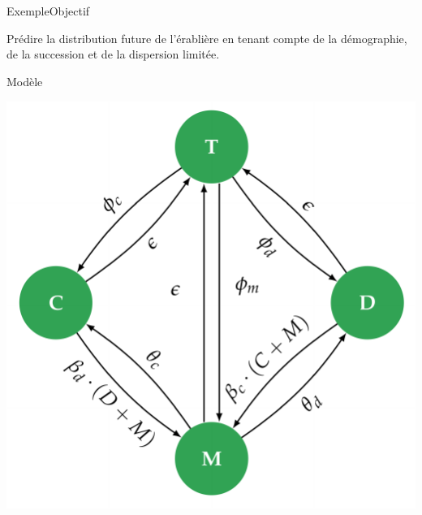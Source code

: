 \documentclass{eecslides}
\begin{document}
	\begin{frame}{Exemple}{Objectif}
		\begin{center}
			Prédire la distribution future de l'érablière en tenant compte de la démographie, de la succession et de la dispersion limitée.
		\end{center}
	\end{frame}


	\begin{frame}{Modèle}
		\begin{center}
			\includegraphics[height=0.6\textheight]{model}
		\end{center}
	\end{frame}

\end{document}

